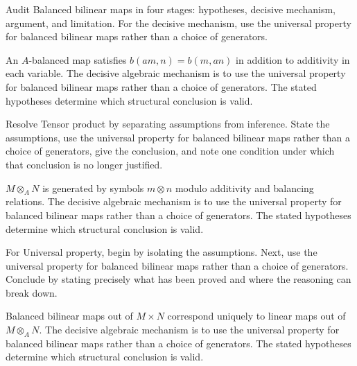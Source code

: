 \begin{problem}\label{prob:v10-problem-01}
Audit Balanced bilinear maps in four stages: hypotheses, decisive mechanism, argument, and limitation. For the decisive mechanism, use the universal property for balanced bilinear maps rather than a choice of generators.
\end{problem}
\begin{solution}
An $A$-balanced map satisfies $b(am,n)=b(m,an)$ in addition to additivity in each variable. The decisive algebraic mechanism is to use the universal property for balanced bilinear maps rather than a choice of generators. The stated hypotheses determine which structural conclusion is valid.
\end{solution}

\begin{problem}\label{prob:v10-problem-02}
Resolve Tensor product by separating assumptions from inference. State the assumptions, use the universal property for balanced bilinear maps rather than a choice of generators, give the conclusion, and note one condition under which that conclusion is no longer justified.
\end{problem}
\begin{solution}
$M\otimes_A N$ is generated by symbols $m\otimes n$ modulo additivity and balancing relations. The decisive algebraic mechanism is to use the universal property for balanced bilinear maps rather than a choice of generators. The stated hypotheses determine which structural conclusion is valid.
\end{solution}

\begin{problem}\label{prob:v10-problem-03}
For Universal property, begin by isolating the assumptions. Next, use the universal property for balanced bilinear maps rather than a choice of generators. Conclude by stating precisely what has been proved and where the reasoning can break down.
\end{problem}
\begin{solution}
Balanced bilinear maps out of $M\times N$ correspond uniquely to linear maps out of $M\otimes_A N$. The decisive algebraic mechanism is to use the universal property for balanced bilinear maps rather than a choice of generators. The stated hypotheses determine which structural conclusion is valid.
\end{solution}


